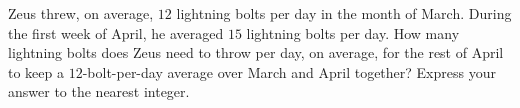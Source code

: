 Zeus threw, on average, $12$ lightning bolts per day in the month of March. During the first week of April, he averaged $15$ lightning bolts per day. How many lightning bolts does Zeus need to throw per day, on average, for the rest of April to keep a $12$-bolt-per-day average over March and April together? Express your answer to the nearest integer.
